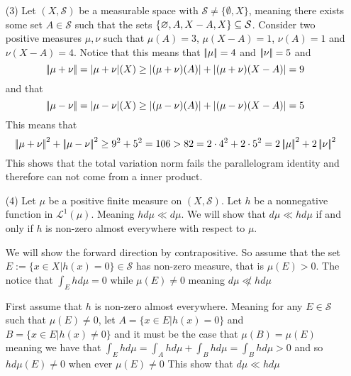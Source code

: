 \documentclass[12pt]{amsart}
\begin{document}
\begin{itemize}
\begin{enumerate}[label=(\alph*)]
    \end{enumerate}
    \item[(3)] Let $(X,\mathcal S)$ be a measurable space with 
    $\mathcal S\neq \{\emptyset, X\}$, meaning there exists some set $A\in \mathcal S$ such 
    that the sets $\{\varnothing, A, X-A, X\}\subseteq \mathcal S$. Consider two positive measures 
    $\mu,\nu$ such that $\mu(A)=3$, $\mu(X-A)=1$,  $\nu(A)=1$ and $\nu(X-A)=4$.
    Notice that this means that $\norm{\mu}=4$ and $\norm{\nu}=5$ and 
    \[\norm{\mu+\nu}=|\mu+\nu|(X)\geq |(\mu+\nu)(A)|+|(\mu+\nu)(X-A)|=9\] 
    and that
    \[\norm{\mu-\nu}=|\mu-\nu|(X)\geq |(\mu-\nu)(A)|+|(\mu-\nu)(X-A)|=5\]
    This means that 
    \[\norm{\mu+\nu}^2+\norm{\mu-\nu}^2\geq 9^2+5^2=106 > 82=2\cdot 4^2+2\cdot 5^2=2\norm{\mu}^2+2\norm{\nu}^2\]
    This shows that the total variation norm fails the parallelogram identity and therefore can not come from a inner product.


    \item[(4)] Let $\mu$ be a positive finite measure on $(X,\mathcal S)$. 
    Let $h$ be a nonnegative function in $\mathcal L^1(\mu)$. Meaning $hd\mu\ll d\mu$.
    We will show that $d\mu\ll hd\mu$ if and only if $h$ is non-zero almost everywhere with respect to $\mu$.
    
    We will show the forward direction by contrapositive. So assume that the set
    $E:=\{x\in X| h(x)=0\}\in\mathcal S$ has non-zero measure, that is $\mu(E)> 0$.
    The notice that $\int_{E}h d\mu=0$ while $\mu(E)\neq 0$ meaning $d\mu\not\ll hd\mu$

    
    First assume that $h$ is non-zero almost everywhere. Meaning for any $E\in\mathcal S$ 
    such that $\mu(E)\neq 0$, let $A=\{x\in E| h(x)=0\}$ and $B=\{x\in E| h(x)\neq 0\}$ 
    and it must be the case that $\mu(B)=\mu(E)$ meaning we
    have that $\int_E h d\mu= \int_A h d\mu+\int_B h d\mu=\int_B h d\mu>0$ and 
    so $h d\mu(E)\neq 0$ when ever $\mu(E)\neq 0$
    This show that $d\mu\ll hd\mu$

\end{itemize}
\end{document}
